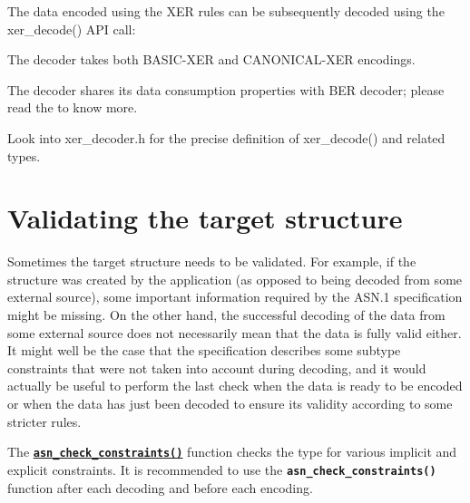 \documentclass[english,oneside,12pt]{book}
\newcommand{\api}[2]{\hyperref[#1]{\code{#2}}}
\newcommand{\code}[1]{\texttt{\textbf{\lstinline{#1}}}}
\begin{document}
The data encoded using the XER rules can be subsequently decoded using
the xer\_decode() API call:
The decoder takes both BASIC-XER and CANONICAL-XER encodings.

The decoder shares its data consumption properties with BER decoder;
please read the  to know more.

Look into xer\_decoder.h for the precise definition of xer\_decode()
and related types.


\section{\label{sec:Validating-the-target}Validating the target structure}

Sometimes the target structure needs to be validated. For example,
if the structure was created by the application (as opposed to being
decoded from some external source), some important information required
by the ASN.1 specification might be missing. On the other hand, the
successful decoding of the data from some external source does not
necessarily mean that the data is fully valid either. It might well
be the case that the specification describes some subtype constraints
that were not taken into account during decoding, and it would actually
be useful to perform the last check when the data is ready to be encoded
or when the data has just been decoded to ensure its validity according
to some stricter rules.

The \api{sec:asn_check_constraints}{asn_check_constraints()}
function checks the type for various
implicit and explicit constraints. It is recommended to use the
\code{asn_check_constraints()}
function after each decoding and before each encoding.
\end{document}

